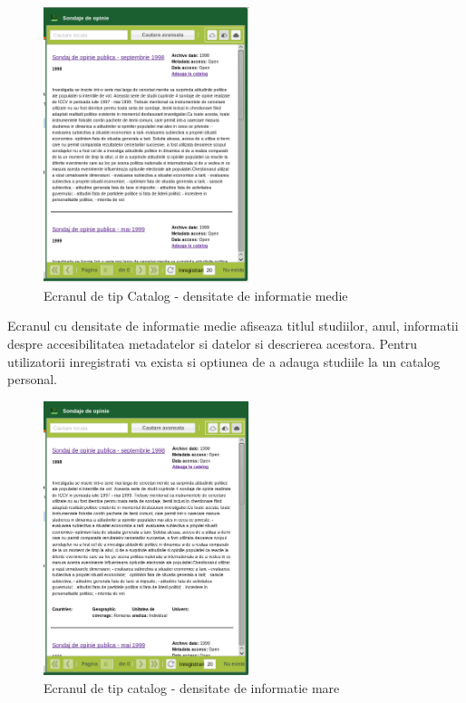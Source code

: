 \begin{figure}[H]
\begin{centering}
\includegraphics[width=6cm]{screenshots/details-panel-catalog-medium}
\par\end{centering}
\caption{Ecranul de tip Catalog - densitate de informatie medie}
\end{figure}

Ecranul cu densitate de informatie medie afiseaza titlul studiilor,
anul, informatii despre accesibilitatea metadatelor si datelor si
descrierea acestora. Pentru utilizatorii inregistrati va exista si
optiunea de a adauga studiile la un catalog personal. 

\begin{figure}[H]
\begin{centering}
\includegraphics[width=6cm]{screenshots/details-panel-catalog-large}
\par\end{centering}
\caption{Ecranul de tip catalog - densitate de informatie mare}
\end{figure}

